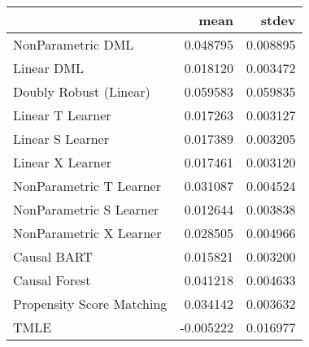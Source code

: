 \begin{tabular}{lrr}
\toprule
{} &      mean &     stdev \\
\midrule
NonParametric DML         &  0.048795 &  0.008895 \\
Linear DML                &  0.018120 &  0.003472 \\
Doubly Robust (Linear)    &  0.059583 &  0.059835 \\
Linear T Learner          &  0.017263 &  0.003127 \\
Linear S Learner          &  0.017389 &  0.003205 \\
Linear X Learner          &  0.017461 &  0.003120 \\
NonParametric T Learner   &  0.031087 &  0.004524 \\
NonParametric S Learner   &  0.012644 &  0.003838 \\
NonParametric X Learner   &  0.028505 &  0.004966 \\
Causal BART               &  0.015821 &  0.003200 \\
Causal Forest             &  0.041218 &  0.004633 \\
Propensity Score Matching &  0.034142 &  0.003632 \\
TMLE                      & -0.005222 &  0.016977 \\
\bottomrule
\end{tabular}
